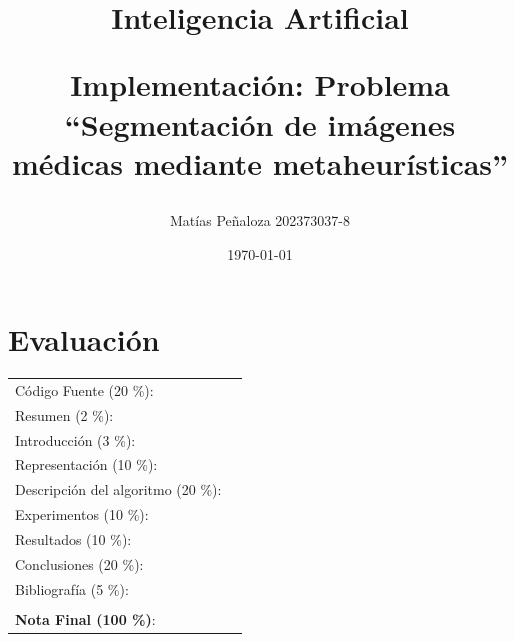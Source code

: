 \documentclass[letter, 10pt]{article}
\begin{document}
\title{Inteligencia Artificial \\ \begin{Large}Implementación: Problema ``Segmentación de imágenes médicas mediante metaheurísticas''\end{Large}}
\author{Matías Peñaloza 202373037-8}
\date{\today}
\maketitle

\section*{Evaluaci\'on}

\begin{tabular}{ll}
C\'odigo Fuente (20 \%): & \underline{\hspace{2cm}}\\
Resumen (2 \%): & \underline{\hspace{2cm}}\\
Introducci\'on (3 \%): & \underline{\hspace{2cm}}\\
Representaci\'on (10 \%): & \underline{\hspace{2cm}} \\
Descripci\'on del algoritmo (20 \%): & \underline{\hspace{2cm}} \\
Experimentos (10 \%): & \underline{\hspace{2cm}} \\
Resultados (10 \%): & \underline{\hspace{2cm}} \\
Conclusiones (20 \%): & \underline{\hspace{2cm}}\\
Bibliograf\'ia (5 \%): & \underline{\hspace{2cm}}\\
 & \\
\textbf{Nota Final (100 \%)}: & \underline{\hspace{2cm}}
\end{tabular}
\vspace{2cm}
\end{document}
